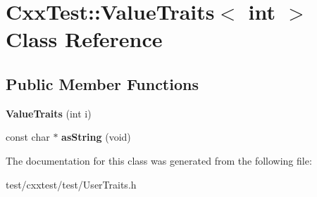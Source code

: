 \hypertarget{classCxxTest_1_1ValueTraits_3_01int_01_4}{\section{Cxx\-Test\-:\-:Value\-Traits$<$ int $>$ Class Reference}
\label{classCxxTest_1_1ValueTraits_3_01int_01_4}
}
\subsection*{Public Member Functions}
\begin{DoxyCompactItemize}
\item 
\hypertarget{classCxxTest_1_1ValueTraits_3_01int_01_4_a14f9689e85f363ac9bb219da5a980bd3}{{\bfseries Value\-Traits} (int i)}\label{classCxxTest_1_1ValueTraits_3_01int_01_4_a14f9689e85f363ac9bb219da5a980bd3}

\item 
\hypertarget{classCxxTest_1_1ValueTraits_3_01int_01_4_ac9b4afac6ab89b8dc8f810eb29aa7edd}{const char $\ast$ {\bfseries as\-String} (void)}\label{classCxxTest_1_1ValueTraits_3_01int_01_4_ac9b4afac6ab89b8dc8f810eb29aa7edd}

\end{DoxyCompactItemize}


The documentation for this class was generated from the following file\-:\begin{DoxyCompactItemize}
\item 
test/cxxtest/test/User\-Traits.\-h\end{DoxyCompactItemize}

